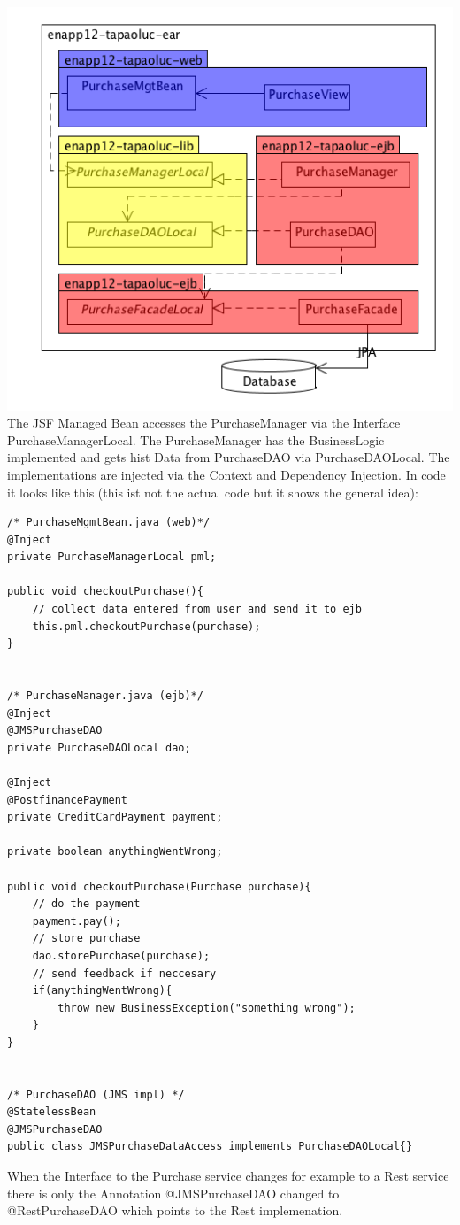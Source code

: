 \documentclass[11pt]{amsart}
\begin{document}
\includegraphics[scale=0.8]{sample-arch.png}\\
The JSF Managed Bean accesses the PurchaseManager via the Interface PurchaseManagerLocal. The PurchaseManager has the BusinessLogic implemented and gets hist Data from PurchaseDAO via PurchaseDAOLocal. The implementations are injected via the Context and Dependency Injection. 
\newpage{}
In code it looks like this (this ist not the actual code but it shows the general idea):\\
\begin{lstlisting}
/* PurchaseMgmtBean.java (web)*/
@Inject
private PurchaseManagerLocal pml;

public void checkoutPurchase(){
	// collect data entered from user and send it to ejb
	this.pml.checkoutPurchase(purchase);
}


/* PurchaseManager.java (ejb)*/
@Inject
@JMSPurchaseDAO
private PurchaseDAOLocal dao;

@Inject
@PostfinancePayment
private CreditCardPayment payment;

private boolean anythingWentWrong;

public void checkoutPurchase(Purchase purchase){
	// do the payment
	payment.pay();
	// store purchase
	dao.storePurchase(purchase);
	// send feedback if neccesary
	if(anythingWentWrong){
		throw new BusinessException("something wrong");
	}
}


/* PurchaseDAO (JMS impl) */
@StatelessBean
@JMSPurchaseDAO
public class JMSPurchaseDataAccess implements PurchaseDAOLocal{}
\end{lstlisting}
%
When the Interface to the Purchase service changes for example to a Rest service there is only the Annotation \textsf{@JMSPurchaseDAO} changed to \textsf{@RestPurchaseDAO} which points to the Rest implemenation. \\
\end{document}
